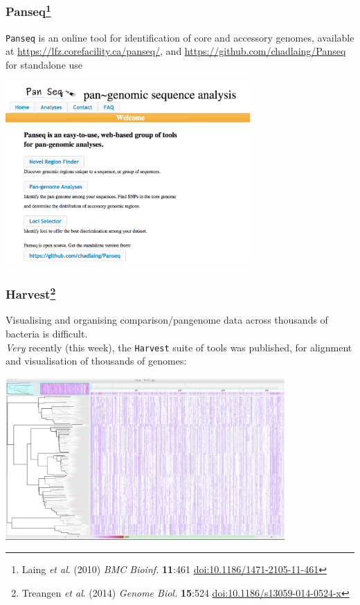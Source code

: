 \begin{frame}
  \frametitle{Panseq\footnote{\tiny{Laing \textit{et al}. (2010) \textit{BMC Bioinf.} \textbf{11}:461 \href{http://dx.doi.org/10.1186/1471-2105-11-461}{doi:10.1186/1471-2105-11-461}}}}
  \texttt{Panseq} is an online tool for identification of core and accessory genomes, available at \href{https://lfz.corefacility.ca/panseq/}{https://lfz.corefacility.ca/panseq/}, and \href{https://github.com/chadlaing/Panseq}{https://github.com/chadlaing/Panseq} for standalone use
  \begin{center}
      \includegraphics[width=0.7\textwidth]{images/panseq} 
  \end{center}
\end{frame}

%
\begin{frame}
  \frametitle{Harvest\footnote{\tiny{Treangen \textit{et al}. (2014) \textit{Genome Biol.} \textbf{15}:524 \href{http://dx.doi.org/10.1186/s13059-014-0524-x}{doi:10.1186/s13059-014-0524-x}}}}
  Visualising and organising comparison/pangenome data across thousands of bacteria is difficult.\\
  \textit{Very} recently (this week), the \texttt{Harvest} suite of tools was published, for alignment and visualisation of thousands of genomes:
  \begin{center}
      \includegraphics[width=0.8\textwidth]{images/harvest} 
  \end{center}
\end{frame}

